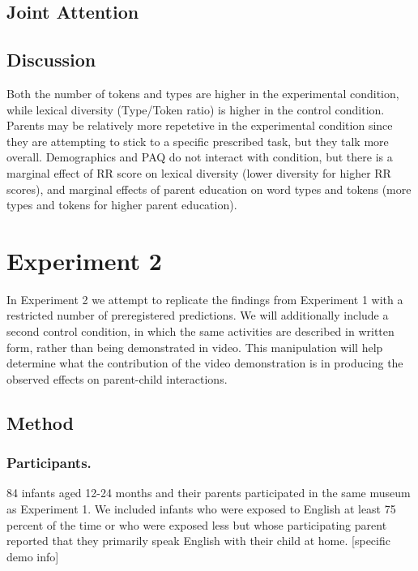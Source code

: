 \documentclass[10pt, letterpaper]{article}
\begin{document}
\subsection{Joint Attention}\label{joint-attention}

\subsection{Discussion}\label{discussion}

Both the number of tokens and types are higher in the experimental
condition, while lexical diversity (Type/Token ratio) is higher in the
control condition. Parents may be relatively more repetetive in the
experimental condition since they are attempting to stick to a specific
prescribed task, but they talk more overall. Demographics and PAQ do not
interact with condition, but there is a marginal effect of RR score on
lexical diversity (lower diversity for higher RR scores), and marginal
effects of parent education on word types and tokens (more types and
tokens for higher parent education).

\section{Experiment 2}\label{experiment-2}

In Experiment 2 we attempt to replicate the findings from Experiment 1
with a restricted number of preregistered predictions. We will
additionally include a second control condition, in which the same
activities are described in written form, rather than being demonstrated
in video. This manipulation will help determine what the contribution of
the video demonstration is in producing the observed effects on
parent-child interactions.

\subsection{Method}\label{method-1}

\subsubsection{Participants.}\label{participants.-1}

84 infants aged 12-24 months and their parents participated in the same
museum as Experiment 1. We included infants who were exposed to English
at least 75 percent of the time or who were exposed less but whose
participating parent reported that they primarily speak English with
their child at home. {[}specific demo info{]}
\end{document}
